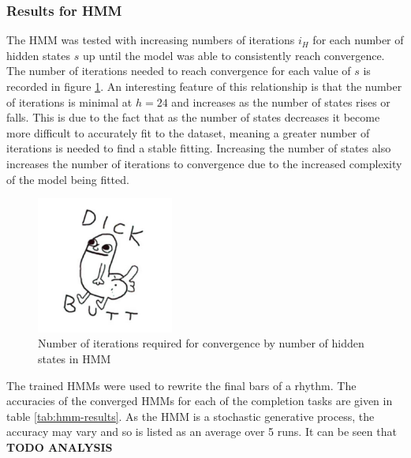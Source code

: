 \documentclass[ author={Stephen Livermore-Tozer},
				supervisor={Dr. Peter Flach},
				degree={MEng},
				title={Algorithmic Co-composition Using Machine Learning},
				subtitle={},
				type={research},
				year={2016} ]{dissertation}
\begin{document}
	\subsubsection{Results for HMM}
	
	The HMM was tested with increasing numbers of iterations $i_H$ for each number of hidden states $s$ up until the model was able to consistently reach convergence. The number of iterations needed to reach convergence for each value of $s$ is recorded in figure \ref{fig:hmm-iterations-convergence}. An interesting feature of this relationship is that the number of iterations is minimal at $h = 24$ and increases as the number of states rises or falls. This is due to the fact that as the number of states decreases it become more difficult to accurately fit to the dataset, meaning a greater number of iterations is needed to find a stable fitting. Increasing the number of states also increases the number of iterations to convergence due to the increased complexity of the model being fitted.
		
	\begin{figure}[h]
		\centering
		\includegraphics[width=0.4\textwidth]{filler}
		\caption{Number of iterations required for convergence by number of hidden states in HMM}
		\label{fig:hmm-iterations-convergence}
	\end{figure}
	
	The trained HMMs were used to rewrite the final bars of a rhythm. The accuracies of the converged HMMs for each of the completion tasks are given in table \ref{tab:hmm-results}. As the HMM is a stochastic generative process, the accuracy may vary and so is listed as an average over 5 runs. It can be seen that \textbf{TODO ANALYSIS}
	
\end{document}
